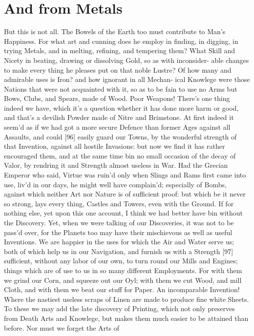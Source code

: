 \documentclass[letterpaper]{book}
\begin{document}
\section{And from Metals}

But this is not all. The Bowels of the Earth too must contribute to Man's
Happiness. For what art and cunning does he employ in finding, in digging,
in trying Metals, and in melting, refining, and tempering them? What Skill
and Nicety in beating, drawing or dissolving Gold, so as with inconsider-
able changes to make every thing he pleases put on that noble Lustre? Of how
many and admirable uses is Iron? and how ignorant in all Mechan- ical
Knowlege were those Nations that were not acquainted with it, so as to be
fain to use no Arms but Bows, Clubs, and Spears, made of Wood.  Poor
Weapons! There's one thing indeed we have, which it's a question whether it
has done more harm or good, and that's a devilish Powder made of Nitre and
Brimstone. At first indeed it seem'd as if we had got a more secure Defence
than former Ages against all Assaults, and could [96] easily guard our
Towns, by the wonderful strength of that Invention, against all hostile
Invasions: but now we find it has rather encouraged them, and at the same
time bin no small occasion of the decay of Valor, by rendring it and
Strength almost useless in War. Had the Grecian Emperor who said, Virtue was
ruin'd only when Slings and Rams first came into use, liv'd in our days, he
might well have complain'd; especially of Bombs, against which neither Art
nor Nature is of sufficient proof: but which be it never so strong, lays
every thing, Castles and Towers, even with the Ground. If for nothing else,
yet upon this one account, I think we had better have bin without the
Discovery. Yet, when we were talking of our Discoveries, it was not to be
pass'd over, for the Planets too may have their mischievous as well as
useful Inventions.  We are happier in the uses for which the Air and Water
serve us; both of which help us in our Navigation, and furnish us with a
Strength [97] sufficient, without any labor of our own, to turn round our
Mills and Engines; things which are of use to us in so many different
Employments. For with them we grind our Corn, and squeeze out our Oyl; with
them we cut Wood, and mill Cloth, and with them we beat our stuff for Paper.
An incomparable Invention! Where the nastiest useless scraps of Linen are
made to produce fine white Sheets. To these we may add the late discovery of
Printing, which not only preserves from Death Arts and Knowlege, but makes
them much easier to be attained than before. Nor must we forget the Arts of
\end{document}
